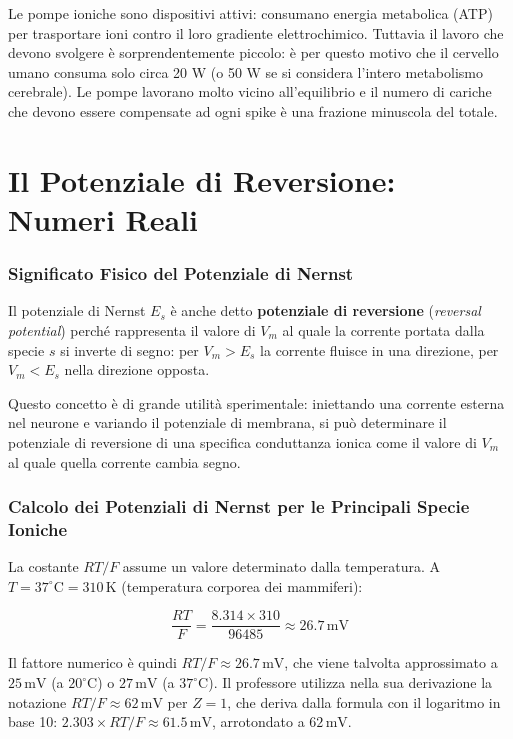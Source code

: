 \begin{tcolorbox}[colback=gray!5, colframe=gray!40, arc=2mm, boxrule=0.5pt]
 Le pompe ioniche sono dispositivi attivi: consumano energia metabolica (ATP) per trasportare ioni contro il loro gradiente elettrochimico. Tuttavia  il lavoro che devono svolgere è sorprendentemente piccolo: è per questo motivo che il cervello umano consuma solo circa 20 W (o 50 W se si considera l'intero metabolismo cerebrale). Le pompe lavorano molto vicino all'equilibrio e il numero di cariche che devono essere compensate ad ogni spike è una frazione minuscola del totale.
\end{tcolorbox}

\section{Il Potenziale di Reversione: Numeri Reali}

\subsubsection{Significato Fisico del Potenziale di Nernst}

Il potenziale di Nernst $E_s$ è anche detto \textbf{potenziale di reversione} (\textit{reversal potential}) perché rappresenta il valore di $V_m$ al quale la corrente portata dalla specie $s$ si inverte di segno: per $V_m > E_s$ la corrente fluisce in una direzione, per $V_m < E_s$ nella direzione opposta.

Questo concetto è di grande utilità sperimentale: iniettando una corrente esterna nel neurone e variando il potenziale di membrana, si può determinare il potenziale di reversione di una specifica conduttanza ionica come il valore di $V_m$ al quale quella corrente cambia segno.

\subsubsection{Calcolo dei Potenziali di Nernst per le Principali Specie Ioniche}

La costante $RT/F$ assume un valore determinato dalla temperatura. A $T = 37^\circ\text{C} = 310\,\text{K}$ (temperatura corporea dei mammiferi):

\begin{equation}
\frac{RT}{F} = \frac{8.314 \times 310}{96485} \approx 26.7\,\text{mV}
\end{equation}

Il fattore numerico è quindi $RT/F \approx 26.7\,\text{mV}$, che viene talvolta approssimato a $25\,\text{mV}$ (a $20^\circ\text{C}$) o $27\,\text{mV}$ (a $37^\circ\text{C}$). Il professore utilizza nella sua derivazione la notazione $RT/F \approx 62\,\text{mV}$ per $Z=1$, che deriva dalla formula con il logaritmo in base 10: $2.303 \times RT/F \approx 61.5\,\text{mV}$, arrotondato a $62\,\text{mV}$.

